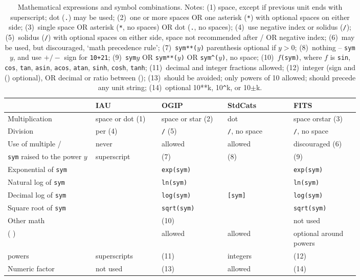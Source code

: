 \documentclass[11pt,notitlepage,onecolumn]{ivoa}
\newcommand{\unit}[1]{\texttt{\small\color{orange}#1}}
\begin{document}
\begin{table}[th]
\begingroup
\begin{tabular}{|L{0.2\linewidth}|L{0.15\linewidth}|L{0.15\linewidth}|L{0.15\linewidth}|L{0.15\linewidth}|}
\hline
    & IAU & OGIP  & StdCats & FITS \\\hline
    Multiplication & space or dot (1)
    	& space or star (2)
	& dot
	& space or\hfil\break star (3) \\\hline
    Division & per (4)
    	& \unit{/} (5)
	& \unit{/}, no space
	& \unit{/}, no space\\\hline
    Use of multiple / & never
    	& allowed 
	& allowed 
	& discouraged (6) \\\hline
    \unit{sym} raised to the power $y$ & superscript 
    	& (7)
	& (8)
	& (9) \\\hline
    Exponential of \unit{sym} &  & \unit{exp(sym)} &  & \unit{exp(sym)} \\\hline\hline
    Natural log of \unit{sym} &  & \unit{ln(sym)} &  & \unit{ln(sym)} \\\hline\hline
    Decimal log of \unit{sym} &  & \unit{log(sym)} & \unit{[sym]} & \unit{log(sym)} \\\hline
    Square root of \unit{sym} &  & \unit{sqrt(sym)} &  & \unit{sqrt(sym)} \\\hline
    Other math &  & (10) &  & not used \\\hline
    ( ) &  & allowed & allowed & optional around powers \\\hline
    powers & superscripts & (11) & integers & (12) \\\hline
    Numeric factor & not used & (13) & allowed & (14) \\\hline
\end{tabular}
\endgroup
\caption[Mathematical expressions and combinations]{Mathematical expressions and symbol combinations.
  \label{tabx:comparUnitCombine}
  Notes: (1) space, except if previous unit ends with superscript; dot (\unit{.}) may be used;
  (2)~one or more spaces OR one asterisk (\unit{*}) with optional spaces on either side;
  (3)~single space OR asterisk (\unit{*}, no spaces) OR dot (\unit{.}, no spaces);
  (4)~use negative index or solidus (\unit{/});
  (5)~solidus (\unit{/}) with optional spaces on either side, space not recommended after / OR negative index;
  (6)~may be used, but discouraged, `math precedence rule';
  (7)~\unit{sym**($y$)} parenthesis optional if $y>0$;
  (8)~nothing -- \unit{sym$y$}, and use $+/-$ sign for \unit{10+21};
  (9)~\unit{sym$y$} OR \unit{sym**($y$)} OR \unit{sym\^{}($y$)}, no space;
  (10)~\unit{$f$(sym)}, where $f$ is
\unit{sin}, \unit{cos}, \unit{tan}, \unit{asin}, \unit{acos}, \unit{atan}, \unit{sinh}, \unit{cosh}, \unit{tanh};
  (11)~decimal and integer fractions allowed;
  (12)~integer (sign and () optional), OR decimal or ratio between ();
  (13)~should be avoided; only powers of 10 allowed; should precede any unit string;
  (14)~optional 10**k, 10\texttt{\^}k, or 10$\pm$k.}
\end{table}
\end{document}
